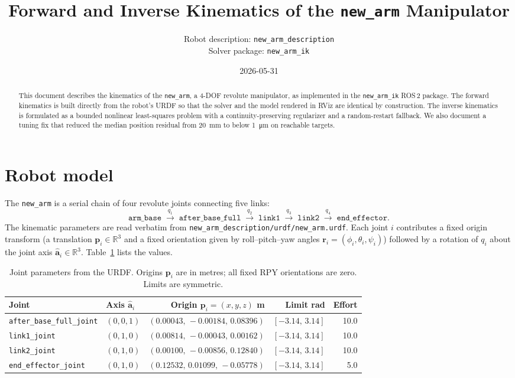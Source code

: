 \documentclass[11pt]{article}
\title{Forward and Inverse Kinematics of the \texttt{new\_arm} Manipulator}
\author{Robot description: \texttt{new\_arm\_description} \\
        Solver package: \texttt{new\_arm\_ik}}
\date{2026-05-31}
\newcommand{\R}{\mathbb{R}}
\begin{document}
\maketitle

\begin{abstract}
This document describes the kinematics of the \texttt{new\_arm}, a 4-DOF
revolute manipulator, as implemented in the \texttt{new\_arm\_ik} ROS\,2
package. The forward kinematics is built directly from the robot's URDF so
that the solver and the model rendered in RViz are identical by construction.
The inverse kinematics is formulated as a bounded nonlinear least-squares
problem with a continuity-preserving regularizer and a random-restart
fallback. We also document a tuning fix that reduced the median position
residual from \SI{20}{\milli\meter} to below \SI{1}{\micro\meter} on
reachable targets.
\end{abstract}

\tableofcontents

\section{Robot model}

The \texttt{new\_arm} is a serial chain of four revolute joints connecting
five links:
\[
\texttt{arm\_base} \;\xrightarrow{\;q_1\;}\;
\texttt{after\_base\_full} \;\xrightarrow{\;q_2\;}\;
\texttt{link1} \;\xrightarrow{\;q_3\;}\;
\texttt{link2} \;\xrightarrow{\;q_4\;}\;
\texttt{end\_effector}.
\]
The kinematic parameters are read verbatim from
\texttt{new\_arm\_description/urdf/new\_arm.urdf}. Each joint $i$ contributes
a fixed origin transform (a translation $\bm{p}_i\in\R^3$ and a fixed
orientation given by roll--pitch--yaw angles $\bm{r}_i=(\phi_i,\theta_i,\psi_i)$)
followed by a rotation of $q_i$ about the joint axis $\hat{\bm{a}}_i\in\R^3$.
Table~\ref{tab:joints} lists the values.

\begin{table}[h]
\centering
\caption{Joint parameters from the URDF. Origins $\bm{p}_i$ are in metres;
all fixed RPY orientations are zero. Limits are symmetric.}
\label{tab:joints}
\small
\begin{tabular}{llrrr}
\toprule
Joint & Axis $\hat{\bm{a}}_i$ & Origin $\bm{p}_i=(x,y,z)$ \si{\meter} & Limit \si{\radian} & Effort \\
\midrule
\texttt{after\_base\_full\_joint} & $(0,0,1)$ & $(0.00043,\,-0.00184,\,0.08396)$ & $[-3.14,\,3.14]$ & 10.0 \\
\texttt{link1\_joint}             & $(0,1,0)$ & $(0.00814,\,-0.00043,\,0.00162)$ & $[-3.14,\,3.14]$ & 10.0 \\
\texttt{link2\_joint}             & $(0,1,0)$ & $(0.00100,\,-0.00856,\,0.12840)$ & $[-3.14,\,3.14]$ & 10.0 \\
\texttt{end\_effector\_joint}     & $(0,1,0)$ & $(0.12532,\,0.01099,\,-0.05778)$ & $[-3.14,\,3.14]$ & 5.0  \\
\bottomrule
\end{tabular}
\end{table}
\end{document}
